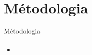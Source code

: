 \section{Métodologia}
\begin{frame}{Métodologia}
  \framesubtitle{}
  
  \begin{itemize}
    \item 
  \end{itemize}
\end{frame}
